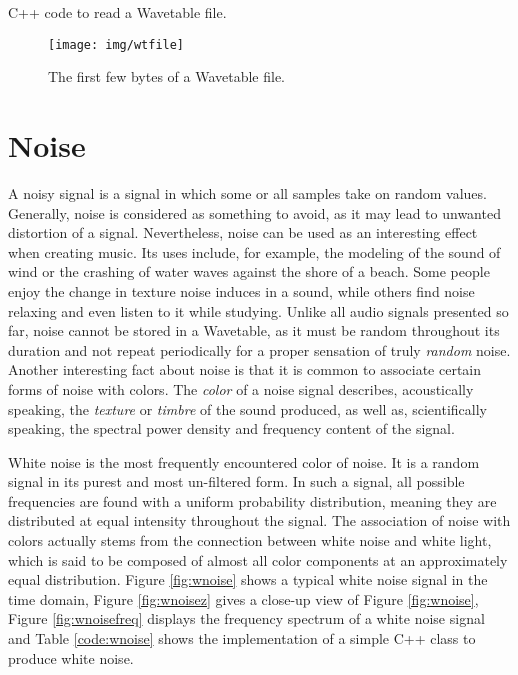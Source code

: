 \begin{table}[h!]
  \caption{C++ code to read a Wavetable file. }
  \label{code:wtfile}
\end{table}

\begin{figure}[h!]
  \texttt{[image: img/wtfile]}
  \caption{The first few bytes of a Wavetable file.}
  \label{fig:wtfile}
\end{figure}

\section{Noise}

A noisy signal is a signal in which some or all samples take on random values. Generally, noise is considered as something to avoid, as it may lead to unwanted distortion of a signal. Nevertheless, noise can be used as an interesting effect when creating music. Its uses include, for example, the modeling of the sound of wind or the crashing of water waves against the shore of a beach. Some people enjoy the change in texture noise induces in a sound, while others find noise relaxing and even listen to it while studying.  Unlike all audio signals presented so far, noise cannot\footnotemark{} be stored in a Wavetable, as it must be random throughout its duration and not repeat periodically for a proper sensation of truly \emph{random} noise. Another interesting fact about noise is that it is common to associate certain forms of noise with colors. The \emph{color} of a noise signal describes, acoustically speaking, the \emph{texture} or \emph{timbre} \footnotemark[2]{} of the sound produced, as well as, scientifically speaking, the spectral power density and frequency content of the signal. \parbreak

White noise is the most frequently encountered color of noise. It is a random signal in its purest and most un-filtered form. In such a signal, all possible frequencies are found with a uniform probability distribution, meaning they are distributed at equal intensity throughout the signal. The association of noise with colors actually stems from the connection between white noise and white light, which is said to be composed of almost all color components at an approximately equal distribution. Figure \ref{fig:wnoise} shows a typical white noise signal in the time domain, Figure \ref{fig:wnoisez} gives a close-up view of Figure \ref{fig:wnoise}, Figure \ref{fig:wnoisefreq} displays the frequency spectrum of a white noise signal and Table \ref{code:wnoise} shows the implementation of a simple C++ class to produce white noise.

